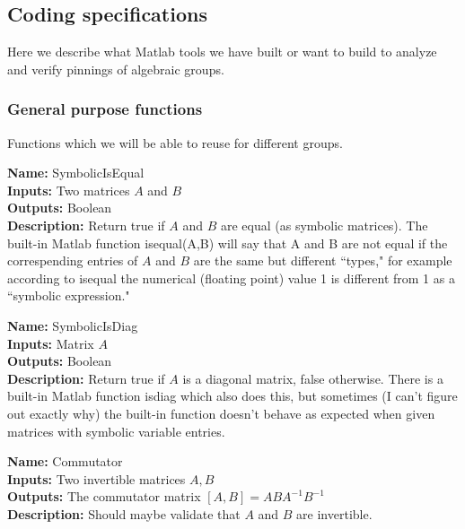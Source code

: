 \documentclass[12pt]{article}
\theoremstyle{definition}
\numberwithin{theorem}{subsection}
\newcommand{\tbf}{\textbf}
\newcommand{\noi}{\noindent}
\newcommand{\inv}{^{-1}}
\begin{document}
\subsection{Coding specifications}

Here we describe what Matlab tools we have built or want to build to analyze and verify pinnings of algebraic groups.

\subsubsection{General purpose functions}

Functions which we will be able to reuse for different groups.

\begin{framed}
\noi \tbf{Name:} SymbolicIsEqual \\
\noi \tbf{Inputs:} Two matrices $A$ and $B$ \\
\noi \tbf{Outputs:} Boolean \\
\noi \tbf{Description:} Return true if $A$ and $B$ are equal (as symbolic matrices). The built-in Matlab function isequal(A,B) will say that A and B are not equal if the correspending entries of $A$ and $B$ are the same but different ``types," for example according to isequal the numerical (floating point) value 1 is different from 1 as a ``symbolic expression."
\end{framed}

\begin{framed}
\noi \tbf{Name:} SymbolicIsDiag \\
\noi \tbf{Inputs:} Matrix $A$ \\
\noi \tbf{Outputs:} Boolean \\
\noi \tbf{Description:} Return true if $A$ is a diagonal matrix, false otherwise. There is a built-in Matlab function isdiag which also does this, but sometimes (I can't figure out exactly why) the built-in function doesn't behave as expected when given matrices with symbolic variable entries.
\end{framed}

\begin{framed}
\noi \tbf{Name:} Commutator \\
\noi \tbf{Inputs:} Two invertible matrices $A,B$ \\
\noi \tbf{Outputs:} The commutator matrix $[A,B] = ABA \inv B \inv$ \\
\noi \tbf{Description:} Should maybe validate that $A$ and $B$ are invertible.
\end{framed}
\end{document}
